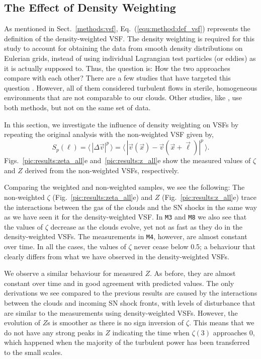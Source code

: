 \subsection{The Effect of Density Weighting}\label{results:densweight}

As mentioned in Sect.~\ref{methods:vsf}, Eq.~(\ref{equ:method:def_vsf}) represents the definition of the density-weighted VSF.
The density weighting is required for this study to account for obtaining the data from smooth density distributions on Eulerian grids, instead of using individual Lagrangian test particles (or eddies) as it is actually supposed to.
Thus, the question is: How the two approaches compare with each other?
There are a few studies that have targeted this question \citep[e.g.,][]{Benzi1993,Benzi2010,Gotoh2002,Schmidt2008}. 
However, all of them considered turbulent flows in sterile, homogeneous environments that are not comparable to our clouds.
Other studies, like \citet{Padoan2016a}, use both methods, but not on the same set of data. 

In this section, we investigate the influence of density weighting on VSFs by repeating the original analysis with the non-weighted VSF given by,
\begin{equation}
	\mathit{S}_p (\ell) = \langle \, |\Delta \vec{v}|^p  \, \rangle = \langle \, |\vec{v}(\vec{x}) - \vec{v}(\vec{x} + \vec{\ell})|^p  \, \rangle .
    \label{equ:results:def_vsf_no}
\end{equation}
Figs.~\ref{pic:results:zeta_all}e and~\ref{pic:results:z_all}e show the measured values of $\zeta$ and $Z$ derived from the non-weighted VSFs, respectively.

Comparing the weighted and non-weighted samples, we see the following:
The non-weighted $\zeta$ (Fig.~\ref{pic:results:zeta_all}e) and $Z$ (Fig.~\ref{pic:results:z_all}e) trace the interactions between the gas of the clouds and the SN shocks in the same way as we have seen it for the density-weighted VSF.
In \texttt{M3} and \texttt{M8} we also see that the values of $\zeta$ decrease as the clouds evolve, yet not as fast as they do in the density-weighted VSFs. 
The measurements in \texttt{M4}, however, are almost constant over time. 
In all the cases, the values of $\zeta$ never cease below 0.5; a behaviour that clearly differs from what we have observed in the density-weighted VSFs.

We observe a similar behaviour for measured $Z$. 
As before, they are almost constant over time and in good agreement with predicted values.
The only derivations we see compared to the previous results are caused by the interactions between the clouds and incoming SN shock fronts, with levels of disturbance that are similar to the measurements using density-weighted VSFs. 
However, the evolution of $Z$s is smoother as there is no sign inversion of $\zeta$.
This means that we do not have any strong peaks in $Z$ indicating the time when $\zeta(3)$ approaches 0, which happened when the majority of the turbulent power has been transferred to the small scales. 

